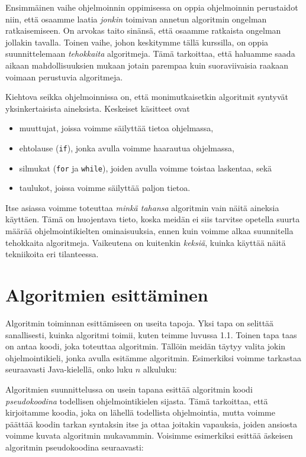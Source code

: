 Ensimmäinen vaihe ohjelmoinnin oppimisessa on oppia
ohjelmoinnin perustaidot niin, että osaamme laatia
\emph{jonkin} toimivan annetun algoritmin ongelman ratkaisemiseen.
On arvokas taito sinänsä, että osaamme ratkaista
ongelman jollakin tavalla.
Toinen vaihe, johon keskitymme tällä kurssilla,
on oppia suunnittelemaan \emph{tehokkaita} algoritmeja.
Tämä tarkoittaa, että haluamme saada aikaan mahdollisuuksien mukaan
jotain parempaa kuin suoraviivaisia
raakaan voimaan perustuvia algoritmeja.

Kiehtova seikka ohjelmoinnissa on, että monimutkaisetkin algoritmit
syntyvät yksinkertaisista aineksista. Keskeiset käsitteet ovat

\begin{itemize}
\item muuttujat, joissa voimme säilyttää tietoa ohjelmassa,
\item ehtolause (\texttt{if}), jonka avulla voimme haarautua ohjelmassa,
\item silmukat (\texttt{for} ja \texttt{while}), joiden avulla voimme
toistaa laskentaa, sekä
\item taulukot, joissa voimme säilyttää paljon tietoa.
\end{itemize}

Itse asiassa voimme toteuttaa \emph{minkä tahansa} algoritmin
vain näitä aineksia käyttäen.
Tämä on huojentava tieto, koska meidän ei siis tarvitse opetella
suurta määrää ohjelmointikielten ominaisuuksia,
ennen kuin voimme alkaa suunnitella tehokkaita algoritmeja.
Vaikeutena on kuitenkin \emph{keksiä}, kuinka käyttää näitä
tekniikoita eri tilanteessa.

\section{Algoritmien esittäminen}

Algoritmin toiminnan esittämiseen on useita tapoja.
Yksi tapa on selittää sanallisesti, kuinka algoritmi toimii,
kuten teimme luvussa 1.1.
Toinen tapa taas on antaa koodi, joka toteuttaa algoritmin.
Tällöin meidän täytyy valita jokin ohjelmointikieli,
jonka avulla esitämme algoritmin.
Esimerkiksi voimme tarkastaa seuraavasti Java-kielellä,
onko luku $n$ alkuluku:


Algoritmien suunnittelussa on usein tapana esittää
algoritmin koodi \emph{pseudokoodina} todellisen ohjelmointikielen sijasta.
Tämä tarkoittaa, että kirjoitamme koodia,
joka on lähellä todellista ohjelmointia, mutta voimme
päättää koodin tarkan syntaksin itse ja ottaa joitakin vapauksia,
joiden ansiosta voimme kuvata algoritmin mukavammin.
Voisimme esimerkiksi esittää äskeisen algoritmin pseudokoodina seuraavasti:

